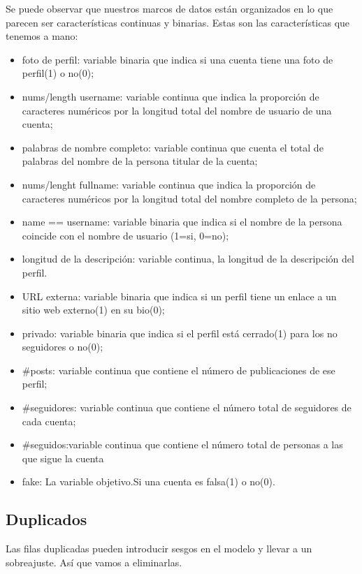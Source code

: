 \documentclass[
  letterpaper,
  DIV=11,
  numbers=noendperiod]{scrreprt}
\begin{document}
Se puede observar que nuestros marcos de datos están organizados en lo
que parecen ser características continuas y binarias. Estas son las
características que tenemos a mano:

\begin{itemize}
\item
  foto de perfil: variable binaria que indica si una cuenta tiene una
  foto de perfil(1) o no(0);
\item
  nums/length username: variable continua que indica la proporción de
  caracteres numéricos por la longitud total del nombre de usuario de
  una cuenta;
\item
  palabras de nombre completo: variable continua que cuenta el total de
  palabras del nombre de la persona titular de la cuenta;
\item
  nums/lenght fullname: variable continua que indica la proporción de
  caracteres numéricos por la longitud total del nombre completo de la
  persona;
\item
  name == username: variable binaria que indica si el nombre de la
  persona coincide con el nombre de usuario (1=si, 0=no);
\item
  longitud de la descripción: variable continua, la longitud de la
  descripción del perfil.
\item
  URL externa: variable binaria que indica si un perfil tiene un enlace
  a un sitio web externo(1) en su bio(0);
\item
  privado: variable binaria que indica si el perfil está cerrado(1) para
  los no seguidores o no(0);
\item
  \#posts: variable continua que contiene el número de publicaciones de
  ese perfil;
\item
  \#seguidores: variable continua que contiene el número total de
  seguidores de cada cuenta;
\item
  \#seguidos:variable continua que contiene el número total de personas
  a las que sigue la cuenta
\item
  fake: La variable objetivo.Si una cuenta es falsa(1) o no(0).
\end{itemize}

\hypertarget{duplicados}{%
\subsection{Duplicados}\label{duplicados}}

Las filas duplicadas pueden introducir sesgos en el modelo y llevar a un
sobreajuste. Así que vamos a eliminarlas.
\end{document}
